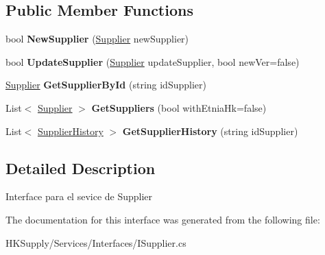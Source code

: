 \subsection*{Public Member Functions}
\begin{DoxyCompactItemize}
\item 
\mbox{\label{interface_h_k_supply_1_1_services_1_1_interfaces_1_1_i_supplier_a7019d71be0f8ed67ccc25b2904742792}} 
bool {\bfseries New\+Supplier} (\mbox{\hyperlink{class_h_k_supply_1_1_models_1_1_supplier}{Supplier}} new\+Supplier)
\item 
\mbox{\label{interface_h_k_supply_1_1_services_1_1_interfaces_1_1_i_supplier_a7a1efffc5b5a474eb28b018c769e744b}} 
bool {\bfseries Update\+Supplier} (\mbox{\hyperlink{class_h_k_supply_1_1_models_1_1_supplier}{Supplier}} update\+Supplier, bool new\+Ver=false)
\item 
\mbox{\label{interface_h_k_supply_1_1_services_1_1_interfaces_1_1_i_supplier_accc763010890f2acb72ff29919752b78}} 
\mbox{\hyperlink{class_h_k_supply_1_1_models_1_1_supplier}{Supplier}} {\bfseries Get\+Supplier\+By\+Id} (string id\+Supplier)
\item 
\mbox{\label{interface_h_k_supply_1_1_services_1_1_interfaces_1_1_i_supplier_a5c32c72848f4188dc21a8e7cab52a55e}} 
List$<$ \mbox{\hyperlink{class_h_k_supply_1_1_models_1_1_supplier}{Supplier}} $>$ {\bfseries Get\+Suppliers} (bool with\+Etnia\+Hk=false)
\item 
\mbox{\label{interface_h_k_supply_1_1_services_1_1_interfaces_1_1_i_supplier_a2e8cb084e806d42f9540cb95ff8dedb3}} 
List$<$ \mbox{\hyperlink{class_h_k_supply_1_1_models_1_1_supplier_history}{Supplier\+History}} $>$ {\bfseries Get\+Supplier\+History} (string id\+Supplier)
\end{DoxyCompactItemize}


\subsection{Detailed Description}
Interface para el sevice de Supplier 



The documentation for this interface was generated from the following file\+:\begin{DoxyCompactItemize}
\item 
H\+K\+Supply/\+Services/\+Interfaces/I\+Supplier.\+cs\end{DoxyCompactItemize}
